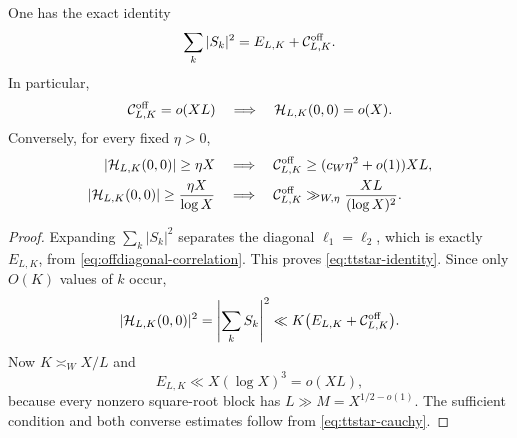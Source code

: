 \begin{theorem}
\label{thm:ttstar-reduction}
One has the exact identity
\begin{equation}
 \sum_k|S_k|^2=E_{L,K}+\mathcal C^{\mathrm{off}}_{L,K}.
 \label{eq:ttstar-identity}
\end{equation}
In particular,
\begin{equation}
 \mathcal C^{\mathrm{off}}_{L,K}=o(XL)
 \quad\Longrightarrow\quad
 \mathcal H_{L,K}(0,0)=o(X).
 \label{eq:ttstar-sufficient-condition}
\end{equation}
Conversely, for every fixed $\eta>0$,
\begin{align}
 |\mathcal H_{L,K}(0,0)|\ge\eta X
 &\quad\Longrightarrow\quad
 \mathcal C^{\mathrm{off}}_{L,K}
 \ge(c_W\eta^2+o(1))XL,
 \label{eq:ttstar-natural-obstruction}\\
 |\mathcal H_{L,K}(0,0)|\ge\frac{\eta X}{\log X}
 &\quad\Longrightarrow\quad
 \mathcal C^{\mathrm{off}}_{L,K}
 \gg_{W,\eta}\frac{XL}{(\log X)^2}.
 \label{eq:ttstar-witness-obstruction}
\end{align}
\end{theorem}

\begin{proof}
Expanding $\sum_k|S_k|^2$ separates the diagonal
$\ell_1=\ell_2$, which is exactly $E_{L,K}$, from
\eqref{eq:offdiagonal-correlation}.  This proves
\eqref{eq:ttstar-identity}.  Since only $O(K)$ values of $k$ occur,
\begin{equation}
 |\mathcal H_{L,K}(0,0)|^2
 =\left|\sum_kS_k\right|^2
 \ll K\bigl(E_{L,K}+\mathcal C^{\mathrm{off}}_{L,K}\bigr).
 \label{eq:ttstar-cauchy}
\end{equation}
Now $K\asymp_WX/L$ and
\begin{equation}
 E_{L,K}\ll X(\log X)^3=o(XL),
 \label{eq:diagonal-negligible-for-ttstar}
\end{equation}
because every nonzero square-root block has
$L\gg M=X^{1/2-o(1)}$.  The sufficient
condition and both converse estimates follow from
\eqref{eq:ttstar-cauchy}.
\end{proof}

